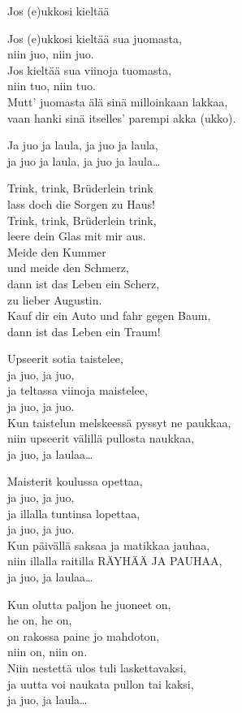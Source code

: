 \begin{song}{Jos (e)ukkosi kieltää}

    \showversenumber	
	Jos (e)ukkosi kieltää sua juomasta,\\
	niin juo, niin juo.\\
	Jos kieltää sua viinoja tuomasta,\\
	niin tuo, niin tuo.\\
	Mutt' juomasta älä sinä milloinkaan lakkaa,\\
	vaan hanki sinä itselles' parempi akka (ukko).
	
	Ja juo ja laula, ja juo ja laula,\\
	ja juo ja laula, ja juo ja laula\ldots{}
		
	Trink, trink, Brüderlein trink\\
	lass doch die Sorgen zu Haus!\\
	Trink, trink, Brüderlein trink,\\
	leere dein Glas mit mir aus.\\
	Meide den Kummer\\
	und meide den Schmerz,\\
	dann ist das Leben ein Scherz,\\
	zu lieber Augustin.\\
	Kauf dir ein Auto und fahr gegen Baum,\\
	dann ist das Leben ein Traum!

    \showversenumber	
	Upseerit sotia taistelee,\\
	ja juo, ja juo,\\
	ja teltassa viinoja maistelee,\\
	ja juo, ja juo.\\
	Kun taistelun melskeessä pyssyt ne paukkaa,\\
	niin upseerit välillä pullosta naukkaa,\\
	ja juo, ja laulaa\ldots{}
	
    \showversenumber
	Maisterit koulussa opettaa,\\
	ja juo, ja juo,\\
	ja illalla tuntinsa lopettaa,\\
	ja juo, ja juo.\\
	Kun päivällä saksaa ja matikkaa jauhaa,\\
	niin illalla raitilla RÄYHÄÄ JA PAUHAA,\\
	ja juo, ja laulaa\ldots{}
	
    \showversenumber
	Kun olutta paljon he juoneet on,\\
	he on, he on,\\
	on rakossa paine jo mahdoton,\\
	niin on, niin on.\\
	Niin nestettä ulos tuli laskettavaksi,\\
	ja uutta voi naukata pullon tai kaksi,\\
	ja juo, ja laula\ldots{}
	

\end{song}
